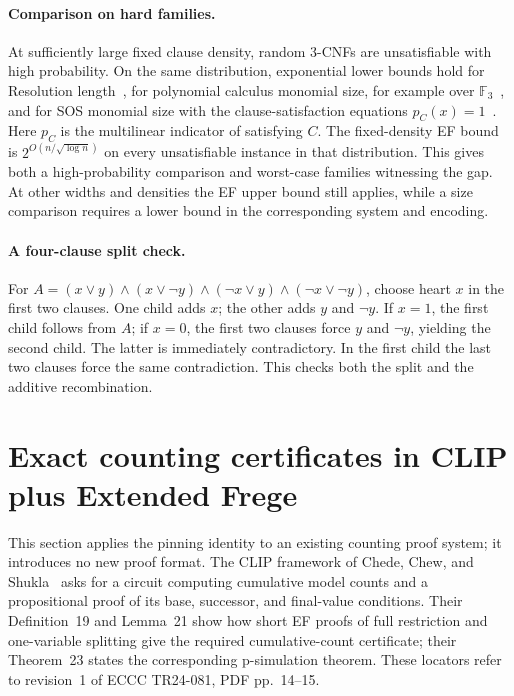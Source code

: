 \documentclass[11pt]{article}
\theoremstyle{definition}
\theoremstyle{remark}
\begin{document}
\paragraph{Comparison on hard families.}
At sufficiently large fixed clause density, random 3-CNFs are
unsatisfiable with high probability. On the same distribution, exponential
lower bounds hold for Resolution length~\cite{BSW}, for polynomial
calculus monomial size, for example over $\mathbb F_3$~\cite{BI},
and for SOS monomial size with the clause-satisfaction equations
$p_C(x)=1$~\cite[Corollary~14]{AH}. Here $p_C$ is the multilinear
indicator of satisfying $C$. The fixed-density EF bound is
$2^{O(n/\sqrt{\log n})}$ on every unsatisfiable instance in that
distribution. This gives both a high-probability comparison and
worst-case families witnessing the gap. At other widths and densities
the EF upper bound still applies, while a size comparison requires
a lower bound in the corresponding system and encoding.

\paragraph{A four-clause split check.}
For
$A=(x\lor y)\land(x\lor\neg y)\land(\neg x\lor y)
\land(\neg x\lor\neg y)$, choose heart $x$ in the first
two clauses. One child adds $x$; the other adds $y$ and
$\neg y$. If $x=1$, the first child follows from $A$; if
$x=0$, the first two clauses force $y$ and $\neg y$, yielding
the second child. The latter is immediately contradictory. In
the first child the last two clauses force the same contradiction.
This checks both the split and the additive recombination.



\section{Exact counting certificates in CLIP plus Extended Frege}
\label{sec:clip-counting}

This section applies the pinning identity to an existing counting
proof system; it introduces no new proof format. The CLIP framework of
Chede, Chew, and Shukla~\cite{ccs} asks for a circuit computing
cumulative model counts and a propositional proof of its base,
successor, and final-value conditions. Their Definition~19 and
Lemma~21 show how short EF proofs of full restriction and one-variable
splitting give the required cumulative-count certificate; their
Theorem~23 states the corresponding p-simulation theorem. These
locators refer to revision~1 of ECCC TR24-081, PDF pp.~14--15.
\end{document}
